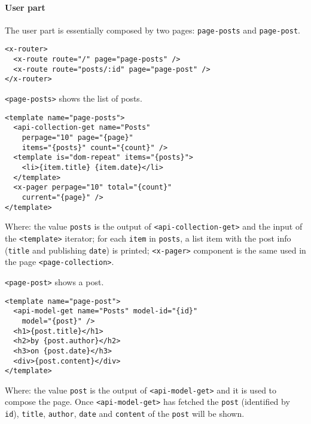 \paragraph{User part}

The user part is essentially composed by two pages: \texttt{page-posts} and \texttt{page-post}.

\begin{lstlisting}[language=HTML5]
<x-router>
  <x-route route="/" page="page-posts" />
  <x-route route="posts/:id" page="page-post" />
</x-router>
\end{lstlisting}

\texttt{<page-posts>} shows the list of posts.

\begin{lstlisting}[language=HTML5]
<template name="page-posts">
  <api-collection-get name="Posts"
    perpage="10" page="{page}" 
    items="{posts}" count="{count}" />
  <template is="dom-repeat" items="{posts}">
    <li>{item.title} {item.date}</li>
  </template>
  <x-pager perpage="10" total="{count}" 
    current="{page}" />
</template>
\end{lstlisting}

Where:
the value \texttt{posts} is the output of \texttt{<api-collection-get>} and the input of the \texttt{<template>} iterator; for each \texttt{item} in \texttt{posts}, a list item with the post info (\texttt{title} and publishing \texttt{date}) is printed;
\texttt{<x-pager>} component is the same used in the page \texttt{<page-collection>}.

\vspace{0.2cm}

\texttt{<page-post>} shows a post. 

\begin{lstlisting}[language=HTML5]
<template name="page-post">
  <api-model-get name="Posts" model-id="{id}" 
    model="{post}" />
  <h1>{post.title}</h1>
  <h2>by {post.author}</h2>
  <h3>on {post.date}</h3>
  <div>{post.content}</div>
</template>
\end{lstlisting}

Where:
the value \texttt{post} is the output of \texttt{<api-model-get>} and it is used to compose the page.
Once \texttt{<api-model-get>} has fetched the \texttt{post} (identified by \texttt{id}),
\texttt{title}, \texttt{author}, \texttt{date} and \texttt{content} of the \texttt{post} will be shown.
